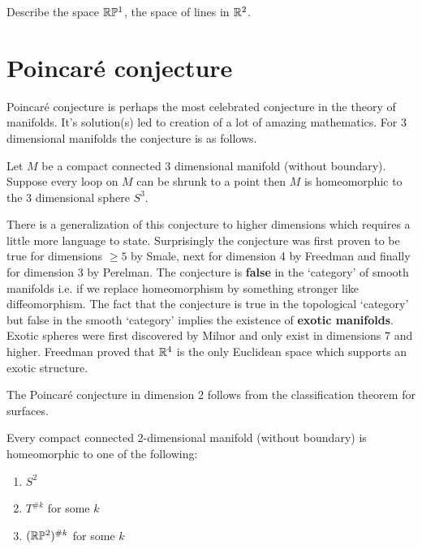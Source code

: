\begin{exercise}
	Describe the space $\mathbb{R}\mathbb{P}^1$, the space of lines in $\mathbb{R}^2$.
\end{exercise}
\section{Poincar\'e conjecture}

Poincar\'e conjecture is perhaps the most celebrated conjecture in the theory of manifolds. It's solution(s) led to creation of a lot of amazing mathematics. For 3 dimensional manifolds the conjecture is as follows.

\begin{thm}
	Let $M$ be a compact connected 3 dimensional manifold (without boundary). Suppose every loop on $M$ can be shrunk to a point then $M$ is homeomorphic to the 3 dimensional sphere $S^3$.
\end{thm}

There is a generalization of this conjecture to higher dimensions which requires a little more language to state. Surprisingly the conjecture was first proven to be true for dimensions $\ge 5$ by Smale, next for dimension 4 by Freedman and finally for dimension 3 by Perelman. The conjecture is \textbf{false} in the `category' of smooth manifolds i.e. if we replace homeomorphism by something stronger like diffeomorphism. The fact that the conjecture is true in the topological `category' but false in the smooth `category' implies the existence of \textbf{exotic manifolds}. Exotic spheres were first discovered by Milnor and only exist in dimensions 7 and higher. Freedman proved that $\mathbb{R}^4$ is the only Euclidean space which supports an exotic structure.

The Poincar\'e conjecture in dimension 2 follows from the classification theorem for surfaces.

\begin{thm}
	Every compact connected 2-dimensional manifold (without boundary) is homeomorphic to one of the following:
	\begin{enumerate}
		\item $S^2$
		\item $T^{\#k}$ for some $k$
		\item $(\mathbb{R}\mathbb{P}^2)^{\#k}$ for some $k$
	\end{enumerate}
\end{thm}


